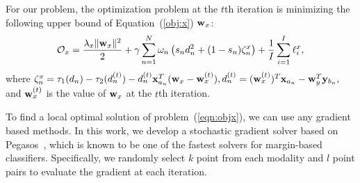 For our problem, the optimization problem at the $t$th iteration is minimizing the following upper bound of Equation~(\ref{obj:x}) \wrt ${\bf w}_x$:
\begin{align}
\mathcal{O}_{x}=\frac{\lambda_{x}\|{\bf w}_{x}\|^{2}}{2}+\gamma\sum\limits_{n=1}^{N}\omega_{n}\left(s_{n}d_{n}^{2}+(1-s_{n})\zeta^{x}_{n}\right) + \frac{1}{I}\sum\limits_{i=1}^{I}\ell_{i}^{x},
\label{eqn:objx}
\end{align}
where $\zeta^{x}_{n} = \tau_{1}(d_{n})-\tau_{2}(d_{n}^{(t)})-{d}^{(t)}_{n}{\bf x}_{a_n}^{T}({\bf w}_{x}-{\bf w}_{x}^{(t)}),{d}^{(t)}_{n} = ({\bf w}^{(t)}_{x})^{T}{\bf x}_{a_n}-{\bf w}_{y}^{T}{\bf y}_{b_n},$
and ${\bf w}_{x}^{(t)}$ is the value of ${\bf w}_{x}$ at the $t$th iteration.


To find a local optimal solution of problem~(\ref{eqn:objx}), we can use any gradient based methods. In this work, we develop a stochastic gradient solver based on Pegasos~\cite{shalev2007icml}, which is known to be one of the fastest solvers for margin-based classifiers. Specifically, we randomly select $k$ point from each modality and $l$ point pairs to evaluate the gradient at each iteration. %

